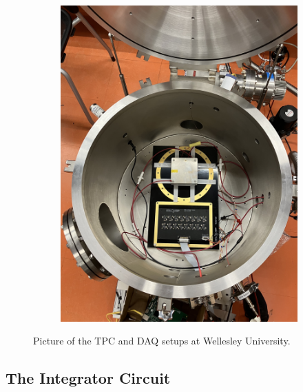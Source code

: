 \begin{figure}
\begin{subfigure}{.5\textwidth}
  \includegraphics[width=\textwidth]{images/saq_wellesley_tpc_daq.jpg}
  \caption{}
\end{subfigure}
\caption{Picture of the TPC and DAQ setups at Wellesley University.}
\end{figure}



\subsection{The Integrator Circuit}



